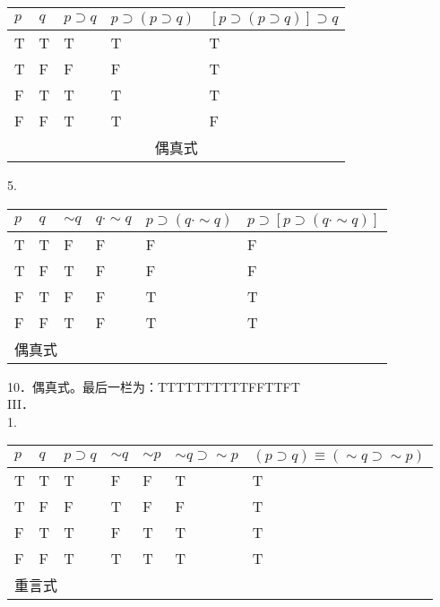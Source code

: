 \begin{center}
\begin{tabular}{|l|l|l|l|l|}
\hline
$p$ & $q$ & $p \supset q$ & $p \supset(p \supset q)$ & $[p \supset(p \supset q)] \supset q$ \\
\hline
T & T & T & T & T \\
\hline
T & F & F & F & T \\
\hline
F & T & T & T & T \\
\hline
F & F & T & T & F \\
\hline
\multicolumn{5}{|c|}{偶真式} \\
\hline
\end{tabular}
\end{center}

5.

\begin{center}
\begin{tabular}{|l|l|l|l|l|l|}
\hline
$p$ & $q$ & $\sim q$ & $q \cdot \sim q$ & $p \supset(q \cdot \sim q)$ & $p \supset[p \supset(q \cdot \sim q)]$ \\
\hline
T & T & F & F & F & F \\
\hline
T & F & T & F & F & F \\
\hline
F & T & F & F & T & T \\
\hline
F & F & T & F & T & T \\
\hline
\multicolumn{6}{|l|}{偶真式} \\
\hline
\end{tabular}
\end{center}

10．偶真式。最后一栏为：TTTTTTTTTTFFTTFT\\
III．\\
1.

\begin{center}
\begin{tabular}{|l|l|l|l|l|l|l|}
\hline
$p$ & $q$ & $p \supset q$ & $\sim q$ & $\sim p$ & $\sim q \supset \sim p$ & $(p \supset q) \equiv(\sim q \supset \sim p)$ \\
\hline
T & T & T & F & F & T & T \\
\hline
T & F & F & T & F & F & T \\
\hline
F & T & T & F & T & T & T \\
\hline
F & F & T & T & T & T & T \\
\hline
\multicolumn{7}{|l|}{重言式} \\
\hline
\end{tabular}
\end{center}

